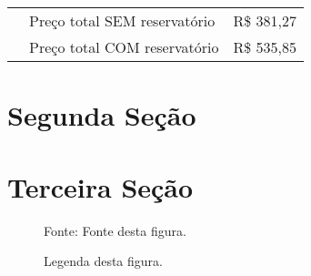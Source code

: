 \begin{table}[!ht]
{\begin{tabular}{c|l|r}
		\midrule
		
		   & Preço total SEM reservatório                         & R\$ 381,27\\
		   & Preço total COM reservatório                         & R\$ 535,85\\
		   
		\bottomrule
		\end{tabular}
		}
		{
		}
	\end{table}

\section{Segunda Seção}
\lipsum[3]

\section{Terceira Seção}
	\begin{figure}[!ht]
		\centering
		\fbox{\rule[10cm]{12cm}{0cm}}
		\caption{Legenda desta figura.}
		\begin{minipage}{\textwidth}
			\centering
			{\small Fonte: Fonte desta figura.}\par
		\end{minipage}
		\label{fig:kitexposicao}
	\end{figure}
